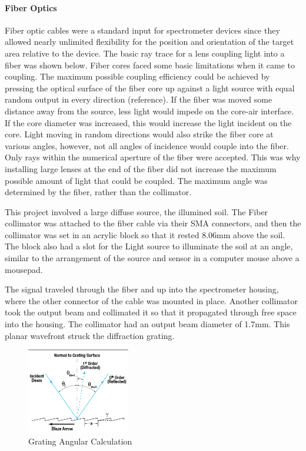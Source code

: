 \paragraph{Fiber Optics} Fiber optic cables were a standard input for spectrometer devices since they allowed nearly unlimited flexibility for the position and orientation of the target area relative to the device. The basic ray trace for a lens coupling light into a fiber was shown below. Fiber cores faced some basic limitations when it came to coupling. The maximum possible coupling efficiency could be achieved by pressing the optical surface of the fiber core up against a light source with equal random output in every direction (reference). If the fiber was moved some distance away from the source, less light would impede on the core-air interface. If the core diameter was increased, this would increase the light incident on the core. Light moving in random directions would also strike the fiber core at various angles, however, not all angles of incidence would couple into the fiber. Only rays within the numerical aperture of the fiber were accepted. This was why installing large lenses at the end of the fiber did not increase the maximum possible amount of light that could be coupled. The maximum angle was determined by the fiber, rather than the collimator.

This project involved a large diffuse source, the illumined soil. The Fiber collimator was attached to the fiber cable via their SMA connectors, and then the collimator was set in an acrylic block so that it rested 8.06mm above the soil. The block also had a slot for the Light source to illuminate the soil at an angle, similar to the arrangement of the source and sensor in a computer mouse above a mousepad.

The signal traveled through the fiber and up into the spectrometer housing, where the other connector of the cable was mounted in place. Another collimator took the output beam and collimated it so that it propagated through free space into the housing. The collimator had an output beam diameter of 1.7mm. This planar wavefront struck the diffraction grating.

\begin{figure}[H]
    \caption{Grating Angular Calculation}
    \centering
    \includegraphics[width=0.4\textwidth]{images/ThorlabsGratingTutorial.png}
\end{figure}

